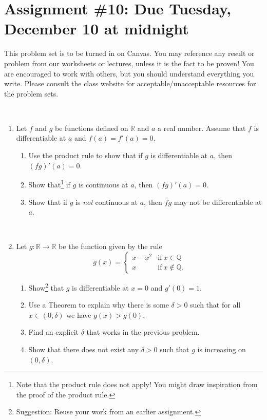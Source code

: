 \documentclass[12pt]{amsart}
\newcommand{\Q}{\mathbb{Q}}
\newcommand{\R}{\mathbb{R}}
\newcommand{\showsol}[1]{\def\displaysol{#1}}
\begin{document}
\showsol{1}
	
	\thispagestyle{empty}
	
	\section*{Assignment \#10: Due Tuesday, December 10 at midnight}
	
	This problem set is to be turned in on Canvas. You may reference any result or problem from our worksheets or lectures, unless it is the fact to be proven! You are encouraged to work with others, but you should understand everything you write. Please consult the class website for acceptable/unacceptable resources for the problem sets.
	
	\
	

\begin{enumerate}


\item Let $f$ and $g$ be functions defined on $\R$ and $a$ a real number. Assume that $f$ is differentiable at $a$ and $f(a) = f'(a)=0$.
\begin{enumerate}
\item Use the product rule to show that if $g$ is differentiable at $a$, then  $(fg)'(a)=0$.
\item Show that\footnote{Note that the product rule does not apply! You might draw inspiration from the proof of the product rule.} if $g$ is continuous at $a$, then $(fg)'(a)=0$.
\item Show that if $g$ is \emph{not} continuous at $a$, then $fg$ may not be differentiable at $a$.
\end{enumerate}

\


\item Let $g:\R\to \R$ be the function given by the rule
\[ g(x) =  \begin{cases} x- x^2 &\text{if} \ x\in \Q \\ x & \text{if} \ x\notin \Q.\end{cases}\]
\begin{enumerate}
\item Show\footnote{Suggestion: Reuse your work from an earlier assignment.} that $g$ is differentiable at $x=0$ and $g'(0)=1$.
\item Use a Theorem to explain why there is some $\delta>0$ such that for all $x\in (0,\delta)$ we have ${g(x) > g(0)}$.
\item Find an explicit $\delta$ that works in the previous problem.
\item Show that there does not exist any $\delta>0$ such that $g$ is increasing on $(0,\delta)$.
\end{enumerate}




\end{enumerate}
\end{document}
